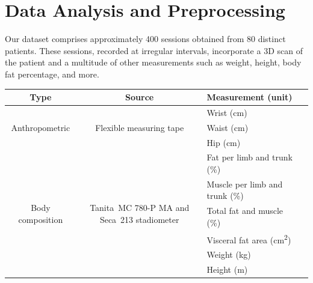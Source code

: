 \chapter{Data Analysis and Preprocessing}\label{chap:data}

Our dataset comprises approximately 400 sessions obtained from 80 distinct
patients. These sessions, recorded at irregular intervals, incorporate a 3D
scan of the patient and a multitude of other measurements such as weight,
height, body fat percentage, and more.

\begin{table}[h]
	\centering
	\begin{tabular}{c c l c}
		\toprule
		Type                               & Source                                                                                         & Measurement (unit)                        \\
		\midrule
		\multirow{3}{*}{Anthropometric}    & \multirow{3}{4cm}{Flexible measuring tape}                                                     & Wrist (cm)                                \\
		                                   &                                                                                                & Waist (cm)                                \\
		                                   &                                                                                                & Hip (cm)                                  \\
		\midrule

		\multirow{6}{*}{Body composition}  & \multirow{6}{4cm}{Tanita\textregistered\ MC 780-P MA and Seca\textregistered\ 213 stadiometer} & Fat per limb and trunk (\%)               \\
		                                   &                                                                                                & Muscle per limb and trunk (\%)            \\
		                                   &                                                                                                & Total fat and muscle (\%)                 \\
		                                   &                                                                                                & Visceral fat area (cm\textsuperscript{2}) \\
		                                   &                                                                                                & Weight (kg)                               \\
		                                   &                                                                                                & Height (m)                                \\
		\midrule


\end{tabular}
\end{table}
